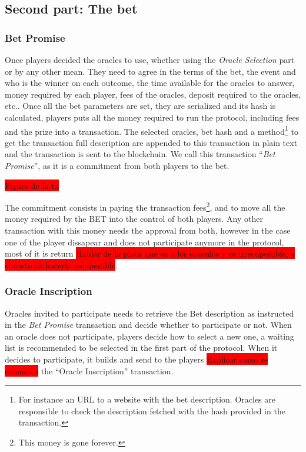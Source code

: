 \subsection{Second part: The bet}

\subsubsection{Bet Promise}
Once players decided the oracles to use, whether using the \textit{Oracle
  Selection} part or by any other mean.
They need to agree in the terms of the bet, the event and who is the winner on
  each outcome, the time available for the oracles to answer, money required by
  each player, fees of the  oracles, deposit required to the oracles, etc..
Once all the bet parameters are set, they are serialized and its hash is
  calculated, players puts all the money required to run the protocol,
  including fees and the prize into a transaction.
The selected oracles, bet hash and a method\footnote{For instance an URL to a
  website with the bet description. Oracles are responsible to check the
  description fetched with the hash provided in the transaction.} to get the
  transaction full description are appended to this transaction in plain text
  and the transaction is sent to the blockchain.
We call this transaction ``\textit{Bet Promise}'', as it is a commitment from both
  players to the bet.

\colorbox{red}{Figura de la tx}

The commitment consists in paying the transaction fees\footnote{This money is
  gone forever.}, and to move all the money required by the BET into the control
  of both players.
Any other transaction with this money needs the approval from both, however in
  the case one of the player dissapear and does not participate anymore in the
  protocol, most of it is return \colorbox{red}{Hablar de la plata que va a los
  oraculos y es irrecuperable, y el costo de hacerla recuperable}.

\subsubsection{Oracle Inscription}
Oracles invited to participate needs to retrieve the Bet description as
  instructed in the \textit{Bet Promise} transaction and decide whether to
  participate or not.
When an oracle does not participate, players decide how to select a new one,
  a waiting list is recommended to be selected in the first part of the
  protocol.
When it decides to participate, it builds and send to the players
  \colorbox{red}{Explicar como se comunica} the ``Oracle Inscription''
  transaction.

